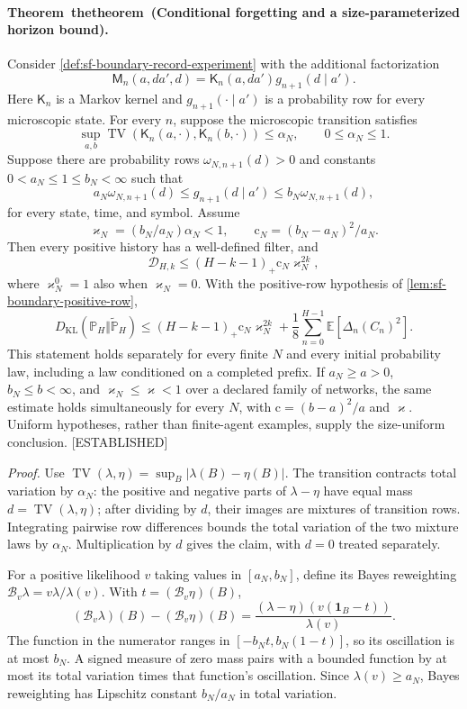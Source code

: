 \documentclass[11pt,letterpaper]{report}
\newcommand{\KL}{D_{\mathrm{KL}}}
\newcounter{statementsequence}[chapter]
\newcommand{\syncstatementcounter}[1]{\stepcounter{statementsequence}\setcounter{#1}{\numexpr\value{statementsequence}-1\relax}\refstepcounter{#1}}
\newcommand{\resultheading}[4]{\syncstatementcounter{#2}\label{#4}\paragraph{#1~\csname the#2\endcsname\ (#3).}}
\newcommand{\theoremheading}[2]{\resultheading{Theorem}{theorem}{#1}{#2}}
\newcommand{\status}[1]{\mbox{{\small\textsc{\textcolor{red!45!black}{[#1]}}}}}
\begin{document}
\theoremheading{Conditional forgetting and a size-parameterized horizon bound}{thm:sf-boundary-forgetting-budget}
Consider \cref{def:sf-boundary-record-experiment} with the additional factorization
\[
 \mathsf M_n(a,da',d)=\mathsf K_n(a,da')g_{n+1}(d\mid a').
\]
Here $\mathsf K_n$ is a Markov kernel and $g_{n+1}(\cdot\mid a')$ is a probability row for every microscopic state. For every $n$, suppose the microscopic transition satisfies
\[
 \sup_{a,b}\operatorname{TV}(\mathsf K_n(a,\cdot),
                              \mathsf K_n(b,\cdot))\le\alpha_N,
 \qquad 0\le\alpha_N\le1.
\]
Suppose there are probability rows $\omega_{N,n+1}(d)>0$ and constants $0<a_N\le1\le b_N<\infty$ such that
\[
 a_N\omega_{N,n+1}(d)
 \le g_{n+1}(d\mid a')
 \le b_N\omega_{N,n+1}(d),
\]
for every state, time, and symbol. Assume
\[
 \varkappa_N=(b_N/a_N)\alpha_N<1,
 \qquad \mathrm c_N=(b_N-a_N)^2/a_N.
\]
Then every positive history has a well-defined filter, and
\[
 \mathcal D_{H,k}
 \le(H-k-1)_+\mathrm c_N\varkappa_N^{2k},
 \label{eq:sf-boundary-exponential-memory}
\]
where $\varkappa_N^0=1$ also when $\varkappa_N=0$. With the positive-row hypothesis of \cref{lem:sf-boundary-positive-row},
\[
 \KL(\mathbb P_H\Vert\widetilde{\mathbb P}_H)
 \le (H-k-1)_+\mathrm c_N\varkappa_N^{2k}
   +\frac18\sum_{n=0}^{H-1}\mathbb E[\Delta_n(C_n)^2].
 \label{eq:sf-boundary-exponential-budget}
\]
This statement holds separately for every finite $N$ and every initial probability law, including a law conditioned on a completed prefix. If $a_N\ge a>0$, $b_N\le b<\infty$, and $\varkappa_N\le\varkappa<1$ over a declared family of networks, the same estimate holds simultaneously for every $N$, with $\mathrm c=(b-a)^2/a$ and $\varkappa$. Uniform hypotheses, rather than finite-agent examples, supply the size-uniform conclusion. \status{ESTABLISHED}

\noindent\emph{Proof.}
Use $\operatorname{TV}(\lambda,\eta)=\sup_B|\lambda(B)-\eta(B)|$. The transition contracts total variation by $\alpha_N$: the positive and negative parts of $\lambda-\eta$ have equal mass $d=\operatorname{TV}(\lambda,\eta)$; after dividing by $d$, their images are mixtures of transition rows. Integrating pairwise row differences bounds the total variation of the two mixture laws by $\alpha_N$. Multiplication by $d$ gives the claim, with $d=0$ treated separately.

For a positive likelihood $v$ taking values in $[a_N,b_N]$, define its Bayes reweighting $\mathscr B_v\lambda=v\lambda/\lambda(v)$. With $t=(\mathscr B_v\eta)(B)$,
\[
 (\mathscr B_v\lambda)(B)-(\mathscr B_v\eta)(B)
 =\frac{(\lambda-\eta)(v(\mathbf1_B-t))}{\lambda(v)}.
\]
The function in the numerator ranges in $[-b_Nt,b_N(1-t)]$, so its oscillation is at most $b_N$. A signed measure of zero mass pairs with a bounded function by at most its total variation times that function's oscillation. Since $\lambda(v)\ge a_N$, Bayes reweighting has Lipschitz constant $b_N/a_N$ in total variation.
\end{document}
